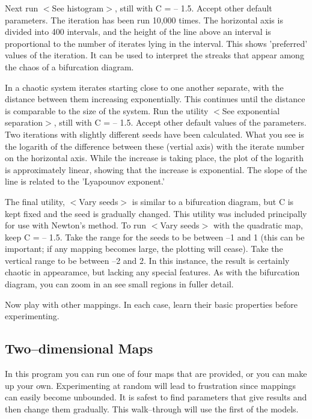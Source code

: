    Next run $<$See histogram$>$, still with C = -- 1.5. Accept other default
parameters. The iteration has been run 10,000 times. The horizontal axis
is divided into 400 intervals, and the height of the line above an interval
is proportional to the number of iterates lying in the interval. This
shows 'preferred' values of the iteration. It can be used to interpret
the streaks that appear among the chaos of a bifurcation diagram.

   In a chaotic system iterates starting close to one another separate,
with the distance between them increasing exponentially. This continues
until the distance is comparable to the size of the system. Run the
utility $<$See exponential separation$>$, still with C = -- 1.5. Accept other
default values of the parameters. Two iterations with slightly different
seeds have been calculated. What you see is the logarith of the
difference between these (vertial axis) with the iterate number on the
horizontal axis. While the increase is taking place, the plot of the
logarith is approximately linear, showing that the increase is exponential.
The slope of the line is related to the 'Lyapounov exponent.'

   The final utility, $<$Vary seeds$>$ is similar to a bifurcation diagram,
but C is kept fixed and the seed is gradually changed. This utility was
included principally for use with Newton's method. To run $<$Vary seeds$>$
with the quadratic map, keep C = -- 1.5. Take the range for the seeds
to be between --1 and 1 (this can be important; if any mapping becomes
large, the plotting will cease). Take the vertical range to be between
--2 and 2. In this instance, the result is certainly chaotic in appearamce,
but lacking any special features. As with the bifurcation diagram, you
can zoom in an see small regions in fuller detail.

   Now play with other mappings. In each case, learn their basic
properties before experimenting.


\subsection{Two--dimensional Maps}

   In this program you can run one of four maps that are provided,
or you can make up your own. Experimenting at random will lead to
frustration since mappings can easily become unbounded. It is safest
to find parameters that give results and then change them gradually.
This walk--through will use the first of the models.

